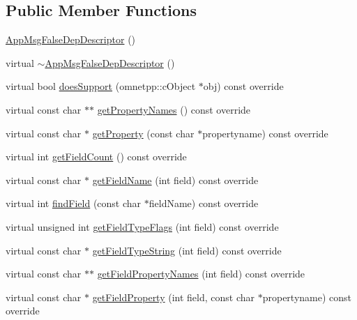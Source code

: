 \subsection*{Public Member Functions}
\begin{DoxyCompactItemize}
\item 
\hyperlink{classAppMsgFalseDepDescriptor_a4ca99cc9f908534f473db357ba25ff2d}{App\+Msg\+False\+Dep\+Descriptor} ()
\item 
virtual \hyperlink{classAppMsgFalseDepDescriptor_a8d7c2d85fad2a90a6cd377ae150345a0}{$\sim$\+App\+Msg\+False\+Dep\+Descriptor} ()
\item 
virtual bool \hyperlink{classAppMsgFalseDepDescriptor_ac3fc2e2a9ff6986bec98c724590aa456}{does\+Support} (omnetpp\+::c\+Object $\ast$obj) const override
\item 
virtual const char $\ast$$\ast$ \hyperlink{classAppMsgFalseDepDescriptor_a550ade508a3c3d84d5781aba6bf02ec8}{get\+Property\+Names} () const override
\item 
virtual const char $\ast$ \hyperlink{classAppMsgFalseDepDescriptor_ac5650d0cbf554966c9fa8a1add231af7}{get\+Property} (const char $\ast$propertyname) const override
\item 
virtual int \hyperlink{classAppMsgFalseDepDescriptor_ade54239f119054d3995dc4e7570718a9}{get\+Field\+Count} () const override
\item 
virtual const char $\ast$ \hyperlink{classAppMsgFalseDepDescriptor_ae89f0e9b564147c2faa20b8ffc47a2bb}{get\+Field\+Name} (int field) const override
\item 
virtual int \hyperlink{classAppMsgFalseDepDescriptor_a9c9cfe9dbacb64401882bc7c4d0e7ef1}{find\+Field} (const char $\ast$field\+Name) const override
\item 
virtual unsigned int \hyperlink{classAppMsgFalseDepDescriptor_a09a72b309888cf637248490b2482e435}{get\+Field\+Type\+Flags} (int field) const override
\item 
virtual const char $\ast$ \hyperlink{classAppMsgFalseDepDescriptor_a83e838bc58a595cfbfe43a9a4ccabb2e}{get\+Field\+Type\+String} (int field) const override
\item 
virtual const char $\ast$$\ast$ \hyperlink{classAppMsgFalseDepDescriptor_a73becb0b27a833d32fde15e0b9b87572}{get\+Field\+Property\+Names} (int field) const override
\item 
virtual const char $\ast$ \hyperlink{classAppMsgFalseDepDescriptor_a9737ecde44ab7bd573cdd94edc494b2f}{get\+Field\+Property} (int field, const char $\ast$propertyname) const override

\end{DoxyCompactItemize}
